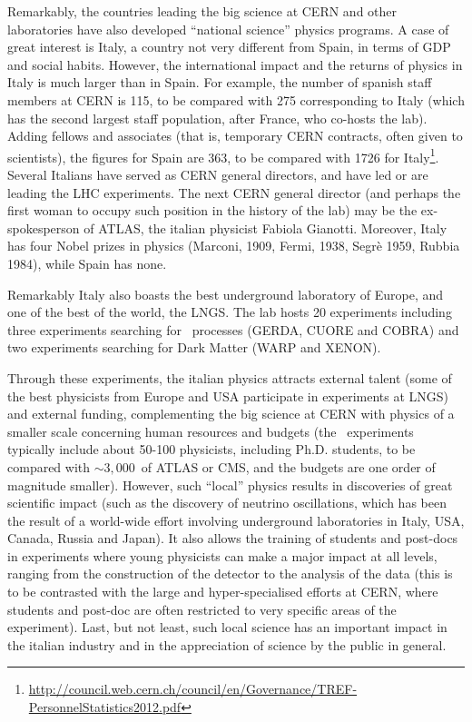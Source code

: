 Remarkably, the countries leading the big science at CERN and other laboratories have also developed ``national science'' physics programs. A case of great interest is Italy, a country not very different from Spain, in terms of GDP and social habits. However, the international impact and the returns of physics in Italy is much larger than in Spain. For example, the number of spanish staff members at CERN is 115, to be compared with 275 corresponding to Italy (which has the second largest staff population, after France, who co-hosts the lab). Adding fellows and associates (that is, temporary CERN contracts, often given to scientists), the figures for Spain are 363, to be compared with 1726 for Italy\footnote{\href{http://council.web.cern.ch/council/en/Governance/TREF-PersonnelStatistics2012.pdf}{http://council.web.cern.ch/council/en/Governance/TREF-PersonnelStatistics2012.pdf}}. Several Italians have served as CERN general directors, and have led or are leading the LHC experiments. The next CERN general director (and perhaps the first woman to occupy such position in the history of the lab) may be the ex-spokesperson of ATLAS, the italian physicist Fabiola Gianotti. Moreover, Italy has four Nobel prizes in physics (Marconi, 1909, Fermi, 1938, Segrè 1959, Rubbia 1984), while Spain has none. 

Remarkably Italy also boasts the best underground laboratory of Europe, and one of the best of the world, the LNGS. The lab hosts 20 experiments including three experiments searching for \bbonu\ processes (GERDA, CUORE and COBRA) and two experiments searching for Dark Matter (WARP and XENON). 

Through these experiments, the italian physics attracts external talent (some of the best physicists from Europe and USA participate in experiments at LNGS) and external funding, complementing the big science at CERN with physics of a smaller scale concerning human resources and budgets (the \bbonu\ experiments typically include about 50-100 physicists, including Ph.D. students, to be compared with $\sim 3,000$~of ATLAS or CMS, and the budgets are one order of magnitude smaller). However, such ``local'' physics results in discoveries of great scientific impact (such as the discovery of neutrino oscillations, which has been the result of a world-wide effort involving underground laboratories in Italy, USA, Canada, Russia and Japan). It also allows the training of students and post-docs in experiments where young physicists can make a major impact at all levels, ranging from the construction of the detector to the analysis of the data (this is to be contrasted with the large and hyper-specialised efforts at CERN, where students and post-doc are often restricted to very specific areas of the experiment). Last, but not least, such local science has an important impact in the italian industry and in the appreciation of science by the public in general. 

